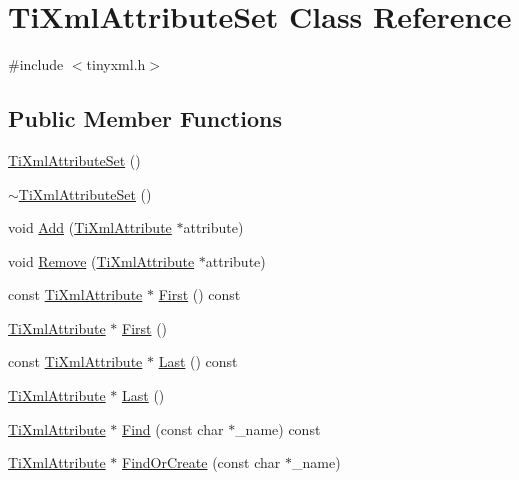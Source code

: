 \hypertarget{class_ti_xml_attribute_set}{}\section{Ti\+Xml\+Attribute\+Set Class Reference}
\label{class_ti_xml_attribute_set}


{\ttfamily \#include $<$tinyxml.\+h$>$}

\subsection*{Public Member Functions}
\begin{DoxyCompactItemize}
\item 
\hyperlink{class_ti_xml_attribute_set_a253c33b657cc85a07f7f060b02146c35}{Ti\+Xml\+Attribute\+Set} ()
\item 
\hyperlink{class_ti_xml_attribute_set_add463905dff96142a29fe16a01ecf28f}{$\sim$\+Ti\+Xml\+Attribute\+Set} ()
\item 
void \hyperlink{class_ti_xml_attribute_set_a745e50ddaae3bee93e4589321e0b9c1a}{Add} (\hyperlink{class_ti_xml_attribute}{Ti\+Xml\+Attribute} $\ast$attribute)
\item 
void \hyperlink{class_ti_xml_attribute_set_a924a73d071f2573f9060f0be57879c57}{Remove} (\hyperlink{class_ti_xml_attribute}{Ti\+Xml\+Attribute} $\ast$attribute)
\item 
const \hyperlink{class_ti_xml_attribute}{Ti\+Xml\+Attribute} $\ast$ \hyperlink{class_ti_xml_attribute_set_a85dfd2b5bae45c94334dced146f5c11a}{First} () const
\item 
\hyperlink{class_ti_xml_attribute}{Ti\+Xml\+Attribute} $\ast$ \hyperlink{class_ti_xml_attribute_set_a99703bb08ca2aece2d7ef835de339ba0}{First} ()
\item 
const \hyperlink{class_ti_xml_attribute}{Ti\+Xml\+Attribute} $\ast$ \hyperlink{class_ti_xml_attribute_set_a3b0d49f3802effcf377f32d9a359302c}{Last} () const
\item 
\hyperlink{class_ti_xml_attribute}{Ti\+Xml\+Attribute} $\ast$ \hyperlink{class_ti_xml_attribute_set_ab4c4edfb2d74f6ea31aae096743bd6e0}{Last} ()
\item 
\hyperlink{class_ti_xml_attribute}{Ti\+Xml\+Attribute} $\ast$ \hyperlink{class_ti_xml_attribute_set_a6d4f03bb84f70c78171db27a869225c1}{Find} (const char $\ast$\+\_\+name) const
\item 
\hyperlink{class_ti_xml_attribute}{Ti\+Xml\+Attribute} $\ast$ \hyperlink{class_ti_xml_attribute_set_a5e28f5d32f048fba85d04dc317495bdc}{Find\+Or\+Create} (const char $\ast$\+\_\+name)
\end{DoxyCompactItemize}


